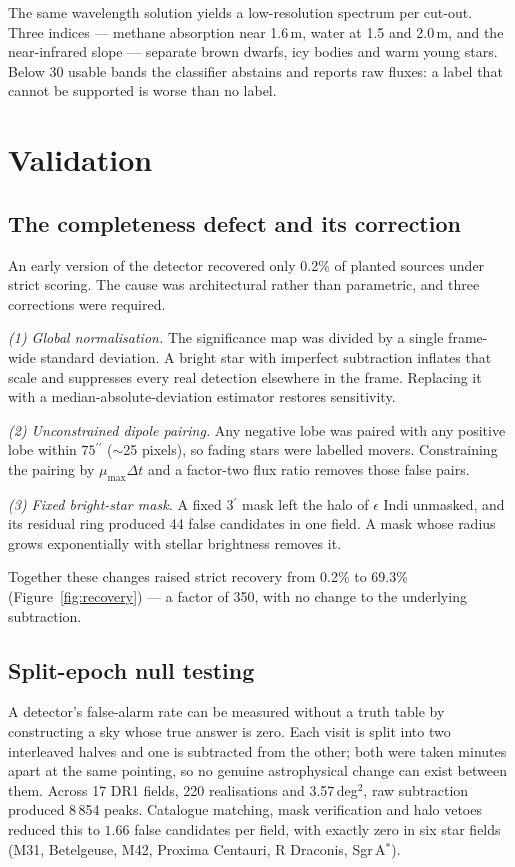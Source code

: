 \documentclass[11pt,a4paper]{article}
\newcommand{\arcsec}{\ensuremath{{}^{\prime\prime}}}
\newcommand{\arcmin}{\ensuremath{{}^{\prime}}}
\begin{document}
{The same wavelength solution yields a low-resolution spectrum per cut-out. Three indices --- methane
absorption near 1.6\,\textmu m, water at 1.5 and 2.0\,\textmu m, and the near-infrared slope ---
separate brown dwarfs, icy bodies and warm young stars. Below 30 usable bands the classifier abstains
and reports raw fluxes: a label that cannot be supported is worse than no label.


\section{Validation}
\label{sec:validation}

\subsection{The completeness defect and its correction}
An early version of the detector recovered only 0.2\% of planted sources under strict scoring. The
cause was architectural rather than parametric, and three corrections were required.

\emph{(1) Global normalisation.} The significance map was divided by a single frame-wide standard
deviation. A bright star with imperfect subtraction inflates that scale and suppresses every real
detection elsewhere in the frame. Replacing it with a median-absolute-deviation estimator restores
sensitivity.

\emph{(2) Unconstrained dipole pairing.} Any negative lobe was paired with any positive lobe within
$75\arcsec$ ($\sim$25 pixels), so fading stars were labelled movers. Constraining the pairing by
$\mu_{\max}\Delta t$ and a factor-two flux ratio removes those false pairs.

\emph{(3) Fixed bright-star mask.} A fixed $3\arcmin$ mask left the halo of $\epsilon$ Indi
unmasked, and its residual ring produced 44 false candidates in one field. A mask whose radius grows
exponentially with stellar brightness removes it.

Together these changes raised strict recovery from 0.2\% to 69.3\% (Figure~\ref{fig:recovery}) ---
a factor of 350, with no change to the underlying subtraction.

\subsection{Split-epoch null testing}
A detector's false-alarm rate can be measured without a truth table by constructing a sky whose true
answer is zero. Each visit is split into two interleaved halves and one is subtracted from the
other; both were taken minutes apart at the same pointing, so no genuine astrophysical change can
exist between them. Across 17 DR1 fields, 220 realisations and 3.57\,deg$^2$, raw subtraction
produced 8\,854 peaks. Catalogue matching, mask verification and halo vetoes reduced this to
$1.66$ false candidates per field, with exactly zero in six star fields (M31, Betelgeuse, M42,
Proxima Centauri, R Draconis, Sgr\,A$^*$).

}
\end{document}
